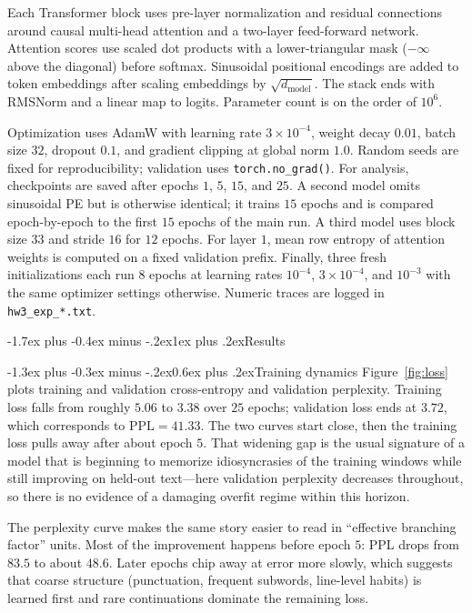 \documentclass[10pt]{article}
\makeatletter
\renewcommand\section{\@startsection{section}{1}{\z@}%
  {-1.7ex plus -0.4ex minus -.2ex}{1ex plus .2ex}{\normalfont\Large\bfseries}}
\renewcommand\subsection{\@startsection{subsection}{2}{\z@}%
  {-1.3ex plus -0.3ex minus -.2ex}{0.6ex plus .2ex}{\normalfont\large\bfseries}}
\makeatother
\begin{document}
Each Transformer block uses pre-layer normalization and residual connections around causal multi-head attention and a two-layer feed-forward network. Attention scores use scaled dot products with a lower-triangular mask ($-\infty$ above the diagonal) before softmax. Sinusoidal positional encodings are added to token embeddings after scaling embeddings by $\sqrt{d_{\mathrm{model}}}$. The stack ends with RMSNorm and a linear map to logits. Parameter count is on the order of $10^6$.

Optimization uses AdamW with learning rate $3 \times 10^{-4}$, weight decay $0.01$, batch size $32$, dropout $0.1$, and gradient clipping at global norm $1.0$. Random seeds are fixed for reproducibility; validation uses \texttt{torch.no\_grad()}. For analysis, checkpoints are saved after epochs $1$, $5$, $15$, and $25$. A second model omits sinusoidal PE but is otherwise identical; it trains $15$ epochs and is compared epoch-by-epoch to the first $15$ epochs of the main run. A third model uses block size $33$ and stride $16$ for $12$ epochs. For layer $1$, mean row entropy of attention weights is computed on a fixed validation prefix. Finally, three fresh initializations each run $8$ epochs at learning rates $10^{-4}$, $3 \times 10^{-4}$, and $10^{-3}$ with the same optimizer settings otherwise. Numeric traces are logged in \texttt{hw3\_exp\_*.txt}.

\section{Results}

\subsection{Training dynamics}
Figure~\ref{fig:loss} plots training and validation cross-entropy and validation perplexity. Training loss falls from roughly $5.06$ to $3.38$ over $25$ epochs; validation loss ends at $3.72$, which corresponds to $\mathrm{PPL} = 41.33$. The two curves start close, then the training loss pulls away after about epoch $5$. That widening gap is the usual signature of a model that is beginning to memorize idiosyncrasies of the training windows while still improving on held-out text---here validation perplexity decreases throughout, so there is no evidence of a damaging overfit regime within this horizon.

The perplexity curve makes the same story easier to read in ``effective branching factor'' units. Most of the improvement happens before epoch $5$: PPL drops from $83.5$ to about $48.6$. Later epochs chip away at error more slowly, which suggests that coarse structure (punctuation, frequent subwords, line-level habits) is learned first and rare continuations dominate the remaining loss.
\end{document}
